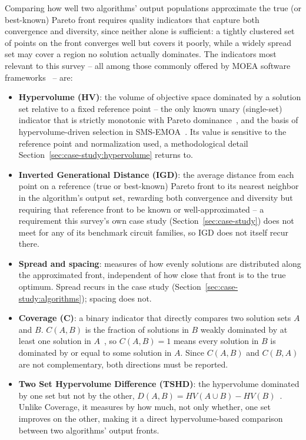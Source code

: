 Comparing how well two algorithms' output populations approximate the
true (or best-known) Pareto front requires quality indicators that
capture both convergence and diversity, since neither alone is
sufficient: a tightly clustered set of points on the front converges well
but covers it poorly, while a widely spread set may cover a region no
solution actually dominates. The indicators most relevant to this
survey -- all among those commonly offered by MOEA software
frameworks~\citep{patrausanu2024frameworks} -- are:
\begin{itemize}
  \item \textbf{Hypervolume (HV)}: the volume of objective space
    dominated by a solution set relative to a fixed reference point --
    the only known unary (single-set) indicator that is strictly
    monotonic with Pareto dominance~\citep{zitzler2003performance}, and
    the basis of hypervolume-driven selection in
    SMS-EMOA~\citep{beume2007smsemoa}. Its value is sensitive to the
    reference point and normalization used, a methodological detail
    Section~\ref{sec:case-study:hypervolume} returns to.
  \item \textbf{Inverted Generational Distance (IGD)}: the average
    distance from each point on a reference (true or best-known) Pareto
    front to its nearest neighbor in the algorithm's output set,
    rewarding both convergence and diversity but requiring that reference
    front to be known or well-approximated -- a requirement this
    survey's own case study (Section~\ref{sec:case-study}) does not
    meet for any of its benchmark circuit families, so IGD does not
    itself recur there.
  \item \textbf{Spread and spacing}: measures of how evenly solutions are
    distributed along the approximated front, independent of how close
    that front is to the true optimum. Spread recurs in the case study
    (Section~\ref{sec:case-study:algorithms}); spacing does not.
  \item \textbf{Coverage (C)}: a binary indicator that directly compares
    two solution sets $A$ and $B$. $C(A,B)$ is the fraction of solutions
    in $B$ weakly dominated by at least one solution in
    $A$~\citep{zitzler1999spea,zitzler2003performance}, so $C(A,B)=1$
    means every solution in $B$ is dominated by or equal to some
    solution in $A$. Since $C(A,B)$ and $C(B,A)$ are not complementary,
    both directions must be reported.
  \item \textbf{Two Set Hypervolume Difference (TSHD)}: the hypervolume
    dominated by one set but not by the other,
    $D(A,B) = HV(A \cup B) - HV(B)$~\citep{zitzler1999thesis}. Unlike
    Coverage, it measures by how much, not only whether, one set
    improves on the other, making it a direct hypervolume-based
    comparison between two algorithms' output fronts.
\end{itemize}
